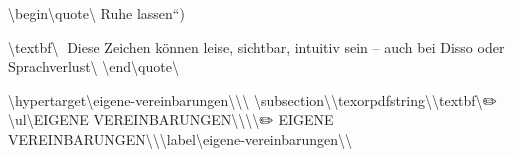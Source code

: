 \textbackslash{}begin\textbackslash{}{quote\textbackslash{}}
Ruhe lassen``)

\textbackslash{}textbf\textbackslash{}{📎 Diese Zeichen können leise, sichtbar, intuitiv sein -- auch bei Disso oder Sprachverlust\textbackslash{}}
\textbackslash{}end\textbackslash{}{quote\textbackslash{}}

\textbackslash{}hypertarget\textbackslash{}{eigene-vereinbarungen\textbackslash{}}\textbackslash{}{\textbackslash{}%
\textbackslash{}subsection\textbackslash{}{\textbackslash{}texorpdfstring\textbackslash{}{\textbackslash{}textbf\textbackslash{}{✏️ \textbackslash{}ul\textbackslash{}{EIGENE VEREINBARUNGEN\textbackslash{}}\textbackslash{}}\textbackslash{}}\textbackslash{}{✏️ EIGENE VEREINBARUNGEN\textbackslash{}}\textbackslash{}}\textbackslash{}label\textbackslash{}{eigene-vereinbarungen\textbackslash{}}\textbackslash{}}

